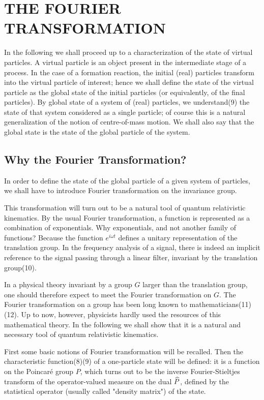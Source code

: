 \documentclass[a4paper,11pt]{article}
\begin{document}
\section{THE FOURIER TRANSFORMATION}

In the following we shall proceed up to a characterization of the state of virtual particles. A 
virtual particle is an object present in the intermediate stage of a process. In the case of a 
formation reaction, the initial (real) particles transform into the virtual particle of 
interest; hence we shall define the state of the virtual particle as the global state of the 
initial particles (or equivalently, of the final particles). By global state of a system of 
(real) particles, we understand(9) the state of that system considered as a single particle; of 
course this is a natural generalization of the notion of centre-of-mass motion. We shall also 
say that the global state is the state of the global particle of the system.

\subsection{Why the Fourier Transformation?}

In order to define the state of the global particle of a given system of particles, we shall 
have to introduce Fourier transformation on the invariance group.

 This transformation will turn out to be a natural tool of quantum relativistic kinematics. By 
the usual Fourier transformation, a function is represented as a combination of exponentials. 
Why exponentials, and not another family of functions? Because the function $e^{i\omega t}$ 
defines a unitary representation of the translation group. In the frequency analysis of a 
signal, there is indeed an implicit reference to the signal passing through a linear filter, 
invariant by the translation group(10).

In a physical theory invariant by a group $G$ larger than the translation group, one should 
therefore expect to meet the Fourier transformation on $G$. The Fourier transformation on a 
group has been long known to mathematicians(11)(12). Up to now, however, physicists hardly used 
the resources of this mathematical theory. In the following we shall show that it is a natural 
and necessary tool of quantum relativistic kinematics.

First some basic notions of Fourier transformation will be recalled. Then the characteristic 
function(8)(9) of a one-particle state will be defined: it is a function on the Poincar\'e  group 
$P$, which turns out to be the inverse Fourier-Stieltjes transform of the operator-valued 
measure on the dual $\widehat{P}$, defined by the statistical operator (usually called "density 
matrix") of the state.
\end{document}
